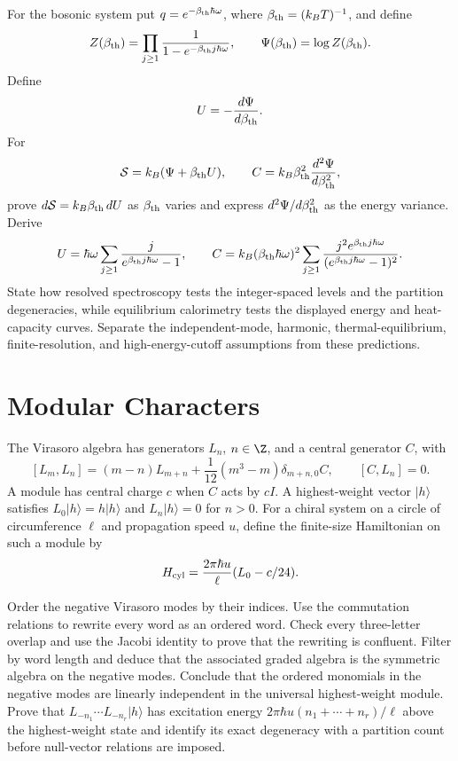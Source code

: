\begin{exercise}
For the bosonic system put $q=e^{-\beta_{\rm th}\hbar\omega}$, where
$\beta_{\rm th}=(k_BT)^{-1}$, and define
\[
Z(\beta_{\rm th})
=\prod_{j\geq1}\frac1{1-e^{-\beta_{\rm th}j\hbar\omega}},
\qquad
\Psi(\beta_{\rm th})=\log Z(\beta_{\rm th}).
\]
Define
\[
U=-\frac{d\Psi}{d\beta_{\rm th}}.
\]
For
\[
\mathcal S=k_B(\Psi+\beta_{\rm th}U),
\qquad
C=k_B\beta_{\rm th}^2\frac{d^2\Psi}{d\beta_{\rm th}^2},
\]
prove $d\mathcal S=k_B\beta_{\rm th}\,dU$ as $\beta_{\rm th}$ varies and
express $d^2\Psi/d\beta_{\rm th}^2$ as the energy variance.  Derive
\[
U=\hbar\omega\sum_{j\geq1}
\frac{j}{e^{\beta_{\rm th}j\hbar\omega}-1},
\qquad
C=k_B(\beta_{\rm th}\hbar\omega)^2
\sum_{j\geq1}
\frac{j^2e^{\beta_{\rm th}j\hbar\omega}}
{(e^{\beta_{\rm th}j\hbar\omega}-1)^2}.
\]
State how resolved spectroscopy tests the integer-spaced levels and the
partition degeneracies, while equilibrium calorimetry tests the displayed
energy and heat-capacity curves.  Separate the independent-mode, harmonic,
thermal-equilibrium, finite-resolution, and high-energy-cutoff assumptions
from these predictions.
\end{exercise}

\section{Modular Characters}

\begin{exercise}
The Virasoro algebra has generators $L_n$, $n\in\Z$, and a central generator
$C$, with
\[
[L_m,L_n]=(m-n)L_{m+n}
+\frac1{12}(m^3-m)\delta_{m+n,0}C,
\qquad [C,L_n]=0.
\]
A module has central charge $c$ when $C$ acts by $cI$.
A highest-weight vector $|h\rangle$ satisfies
$L_0|h\rangle=h|h\rangle$ and $L_n|h\rangle=0$ for $n>0$.
For a chiral system on a circle of circumference $\ell$ and propagation
speed $u$, define the finite-size Hamiltonian on such a module by
\[
H_{\rm cyl}=\frac{2\pi\hbar u}{\ell}(L_0-c/24).
\]

Order the negative Virasoro modes by their indices.  Use the commutation
relations to rewrite every word as an ordered word.  Check every
three-letter overlap and use the Jacobi identity to prove that the rewriting
is confluent.  Filter by word length and deduce that the associated graded
algebra is the symmetric algebra on the negative modes.  Conclude that the
ordered monomials in the negative modes are linearly independent in the
universal highest-weight module.  Prove that
$L_{-n_1}\cdots L_{-n_r}|h\rangle$ has excitation energy
$2\pi\hbar u(n_1+\cdots+n_r)/\ell$ above the highest-weight state and
identify its exact degeneracy with a partition count before null-vector
relations are imposed.
\end{exercise}

